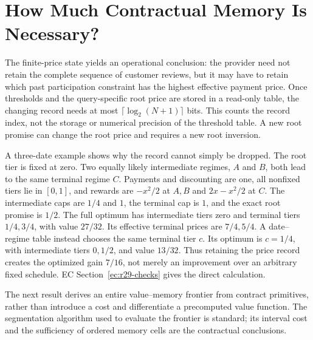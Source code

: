 \section{How Much Contractual Memory Is Necessary?}\label{sec:memory}
The finite-price state yields an operational conclusion: the provider need not retain the complete sequence of customer reviews, but it may have to retain which past participation constraint has the highest effective payment price. Once thresholds and the query-specific root price are stored in a read-only table, the changing record needs at most $\lceil\log_2(N+1)\rceil$ bits. This counts the record index, not the storage or numerical precision of the threshold table. A new root promise can change the root price and requires a new root inversion.

A three-date example shows why the record cannot simply be dropped. The root tier is fixed at zero. Two equally likely intermediate regimes, $A$ and $B$, both lead to the same terminal regime $C$. Payments and discounting are one, all nonfixed tiers lie in $[0,1]$, and rewards are $-x^2/2$ at $A,B$ and $2x-x^2/2$ at $C$. The intermediate caps are $1/4$ and $1$, the terminal cap is $1$, and the exact root promise is $1/2$. The full optimum has intermediate tiers zero and terminal tiers $1/4,3/4$, with value $27/32$. Its effective terminal prices are $7/4,5/4$. A date--regime table instead chooses the same terminal tier $c$. Its optimum is $c=1/4$, with intermediate tiers $0,1/2$, and value $13/32$. Thus retaining the price record creates the optimized gain $7/16$, not merely an improvement over an arbitrary fixed schedule. EC Section~\ref{ec:r29-checks} gives the direct calculation.

The next result derives an entire value--memory frontier from contract primitives, rather than introduce a cost and differentiate a precomputed value function. The segmentation algorithm used to evaluate the frontier is standard; its interval cost and the sufficiency of ordered memory cells are the contractual conclusions.

